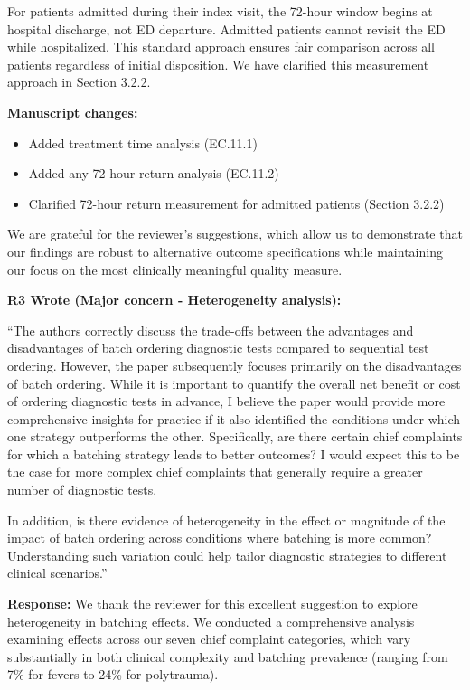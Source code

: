 \documentclass[11pt]{article}
\newenvironment{quote2}
{ \bigskip
\noindent
         \small\em
         \baselineskip=14pt
}
\newcommand{\1}{\hbox{\rm 1\kern-.35em 1}}
\begin{document}
For patients admitted during their index visit, the 72-hour window begins at hospital discharge, not ED departure. Admitted patients cannot revisit the ED while hospitalized. This standard approach ensures fair comparison across all patients regardless of initial disposition. We have clarified this measurement approach in Section 3.2.2.

\textbf{Manuscript changes:}

\begin{itemize}
\item Added treatment time analysis (EC.11.1)
\item Added any 72-hour return analysis (EC.11.2)
\item Clarified 72-hour return measurement for admitted patients (Section 3.2.2)
\end{itemize}

We are grateful for the reviewer's suggestions, which allow us to demonstrate that our findings are robust to alternative outcome specifications while maintaining our focus on the most clinically meaningful quality measure.

\color{black}

\begin{quote2}
\textbf{R3 Wrote (Major concern -  Heterogeneity analysis):}  

\noindent``The authors correctly discuss the trade-offs between the advantages and disadvantages of batch ordering diagnostic tests compared to sequential test ordering. However, the paper subsequently focuses primarily on the disadvantages of batch ordering. While it is important to quantify the overall net benefit or cost of ordering diagnostic tests in advance, I believe the paper would provide more comprehensive insights for practice if it also identified the conditions under which one strategy outperforms the other. Specifically, are there certain chief complaints for which a batching strategy leads to better outcomes? I would expect this to be the case for more complex chief complaints that generally require a greater number of diagnostic tests.

In addition, is there evidence of heterogeneity in the effect or magnitude of the impact of batch ordering across conditions where batching is more common? Understanding such variation could help tailor diagnostic strategies to different clinical scenarios.''

\end{quote2}

\noindent\textbf{Response:} \color{blue}We thank the reviewer for this excellent suggestion to explore heterogeneity in batching effects. We conducted a comprehensive analysis examining effects across our seven chief complaint categories, which vary substantially in both clinical complexity and batching prevalence (ranging from 7\% for fevers to 24\% for polytrauma). 
\end{document}
